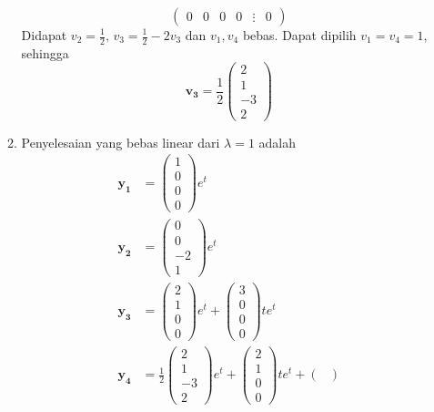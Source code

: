 \documentclass[a4paper]{article}
\theoremstyle{definisi}
\numberwithin{equation}{section}
\begin{document}
\begin{enumerate}
\begin{enumerate}[label=Langkah \arabic*: ,leftmargin=*]
\begin{equation*}
\begin{pmatrix}
          0&0&0&0&\vdots&0
        \end{pmatrix}
      \end{equation*}
      Didapat $v_2=\frac{1}{2},\,v_3=\frac{1}{2}-2v_3$ dan $v_1,v_4$ bebas. Dapat dipilih $v_1=v_4=1$, sehingga
      \begin{equation*}
        \mathbf{v_3}=\frac{1}{2}\begin{pmatrix}
          2\\1\\-3\\2
        \end{pmatrix}
      \end{equation*}
      \item Penyelesaian yang bebas linear dari $\lambda=1$ adalah
      \begin{align*}
        \mathbf{y_1}&=\begin{pmatrix}
          1\\0\\0\\0
        \end{pmatrix}e^{t}\\
        \mathbf{y_2}&=\begin{pmatrix}
          0\\0\\-2\\1
        \end{pmatrix}e^{t}\\
        \mathbf{y_3}&=\begin{pmatrix}
          2\\1\\0\\0
        \end{pmatrix}e^{t}+\begin{pmatrix}
          3\\0\\0\\0
        \end{pmatrix}te^{t}\\
        \mathbf{y_4}&=\frac{1}{2}\begin{pmatrix}
          2\\1\\-3\\2
        \end{pmatrix}e^{t}+\begin{pmatrix}
          2\\1\\0\\0
        \end{pmatrix}te^{t}+\begin{pmatrix}

\end{pmatrix}
\end{align*}
\end{enumerate}
\end{enumerate}
\end{document}
